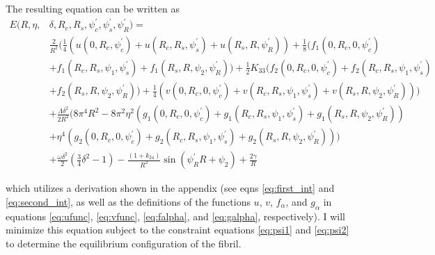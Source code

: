 \documentclass[12pt]{article}
\begin{document}
The resulting equation can be written as
\begin{align}\label{eq:piecewise_E}
E(R,\eta,&\delta,R_c,R_s,\psi_c^{\prime},\psi_s^{\prime},\psi_R^{\prime})=\nonumber\\
&\frac{2}{R^2}\bigg(\frac{1}{4}(u(0,R_c,\psi_c^{\prime})+u(R_c,R_s,\psi_s^{\prime})+u(R_s,R,\psi_R^{\prime}))+\frac{1}{8}(f_1(0,R_c,0,\psi_c^{\prime})\nonumber\\
&+f_1(R_c,R_s,\psi_1,\psi_s^{\prime})+f_1(R_s,R,\psi_2,\psi_R^{\prime}))+\frac{1}{2}K_{33}(f_2(0,R_c,0,\psi_c^{\prime})+f_2(R_c,R_s,\psi_1,\psi_s^{\prime})\nonumber\\
&+f_2(R_s,R,\psi_2,\psi_R^{\prime}))+\frac{1}{4}(v(0,R_c,0,\psi_c^{\prime})+v(R_c,R_s,\psi_1,\psi_s^{\prime})+v(R_s,R,\psi_2,\psi_R^{\prime}))\bigg)\nonumber\\
&+\frac{\Lambda\delta^2}{2R^2}\bigg(8\pi^4R^2-8\pi^2\eta^2(g_1(0,R_c,0,\psi_c^{\prime})+g_1(R_c,R_s,\psi_1,\psi_s^{\prime})+g_1(R_s,R,\psi_2,\psi_R^{\prime}))\nonumber\\
&+\eta^4(g_2(0,R_c,0,\psi_c^{\prime})+g_2(R_c,R_s,\psi_1,\psi_s^{\prime})+g_2(R_s,R,\psi_2,\psi_R^{\prime}))\bigg)\nonumber\\
&+\frac{\omega\delta^2}{2}\left(\frac{3}{4}\delta^2-1\right)-\frac{(1+k_{24})}{R^2}\sin(\psi_R^{\prime}R+\psi_2)+\frac{2\gamma}{R}
\end{align}

which utilizes a derivation shown in the appendix (see eqns \ref{eq:first_int} and \ref{eq:second_int}, as well as the definitions of the functions $u$, $v$, $f_{\alpha}$, and $g_{\alpha}$ in equations \ref{eq:ufunc}, \ref{eq:vfunc}, \ref{eq:falpha}, and \ref{eq:galpha}, respectively). I will minimize this equation subject to the constraint equations \ref{eq:psi1} and \ref{eq:psi2} to determine the equilibrium configuration of the fibril.
\end{document}
